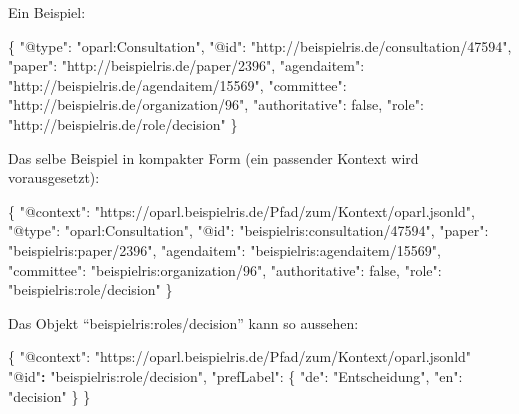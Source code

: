 \documentclass[,a4paper]{article}
\newenvironment{Shaded}{}{}
\newcommand{\DataTypeTok}[1]{\textcolor[rgb]{0.56,0.13,0.00}{{#1}}}
\newcommand{\DecValTok}[1]{\textcolor[rgb]{0.25,0.63,0.44}{{#1}}}
\newcommand{\StringTok}[1]{\textcolor[rgb]{0.25,0.44,0.63}{{#1}}}
\newcommand{\ErrorTok}[1]{\textcolor[rgb]{1.00,0.00,0.00}{\textbf{{#1}}}}
\newcommand{\NormalTok}[1]{{#1}}
\begin{document}
Ein Beispiel:

\begin{Shaded}
\begin{Highlighting}[]
\NormalTok{\{}
    \DataTypeTok{"@type"}\NormalTok{: }\StringTok{"oparl:Consultation"}\NormalTok{,}
    \DataTypeTok{"@id"}\NormalTok{: }\StringTok{"http://beispielris.de/consultation/47594"}\NormalTok{,}
    \DataTypeTok{"paper"}\NormalTok{: }\StringTok{"http://beispielris.de/paper/2396"}\NormalTok{,}
    \DataTypeTok{"agendaitem"}\NormalTok{: }\StringTok{"http://beispielris.de/agendaitem/15569"}\NormalTok{,}
    \DataTypeTok{"committee"}\NormalTok{: }\StringTok{"http://beispielris.de/organization/96"}\NormalTok{,}
    \DataTypeTok{"authoritative"}\NormalTok{: }\DecValTok{false}\NormalTok{,}
    \DataTypeTok{"role"}\NormalTok{: }\StringTok{"http://beispielris.de/role/decision"}
\NormalTok{\}}
\end{Highlighting}
\end{Shaded}

Das selbe Beispiel in kompakter Form (ein passender Kontext wird
vorausgesetzt):

\begin{Shaded}
\begin{Highlighting}[]
\NormalTok{\{}
    \DataTypeTok{"@context"}\NormalTok{: }\StringTok{"https://oparl.beispielris.de/Pfad/zum/Kontext/oparl.jsonld"}\NormalTok{,}
    \DataTypeTok{"@type"}\NormalTok{: }\StringTok{"oparl:Consultation"}\NormalTok{,}
    \DataTypeTok{"@id"}\NormalTok{: }\StringTok{"beispielris:consultation/47594"}\NormalTok{,}
    \DataTypeTok{"paper"}\NormalTok{: }\StringTok{"beispielris:paper/2396"}\NormalTok{,}
    \DataTypeTok{"agendaitem"}\NormalTok{: }\StringTok{"beispielris:agendaitem/15569"}\NormalTok{,}
    \DataTypeTok{"committee"}\NormalTok{: }\StringTok{"beispielris:organization/96"}\NormalTok{,}
    \DataTypeTok{"authoritative"}\NormalTok{: }\DecValTok{false}\NormalTok{,}
    \DataTypeTok{"role"}\NormalTok{: }\StringTok{"beispielris:role/decision"}
\NormalTok{\}}
\end{Highlighting}
\end{Shaded}

Das Objekt ``beispielris:roles/decision'' kann so aussehen:

\begin{Shaded}
\begin{Highlighting}[]
\NormalTok{\{}
    \DataTypeTok{"@context"}\NormalTok{: }\StringTok{"https://oparl.beispielris.de/Pfad/zum/Kontext/oparl.jsonld"}
    \StringTok{"@id"}\ErrorTok{:} \StringTok{"beispielris:role/decision"}\NormalTok{,}
    \DataTypeTok{"prefLabel"}\NormalTok{: \{}
        \DataTypeTok{"de"}\NormalTok{: }\StringTok{"Entscheidung"}\NormalTok{,}
        \DataTypeTok{"en"}\NormalTok{: }\StringTok{"decision"}
    \NormalTok{\}}
\NormalTok{\}}
\end{Highlighting}
\end{Shaded}
\end{document}
